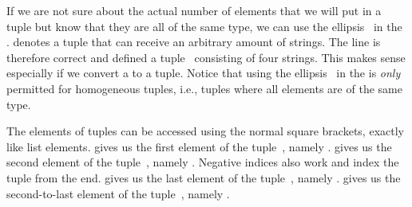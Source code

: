 %
\begin{sloppypar}%
If we are not sure about the actual number of elements that we will put in a tuple but know that they are all of the same type, we can use the ellipsis~\pythonIdx{\idxdots} in the .
 denotes a tuple that can receive an arbitrary amount of strings.
The line  is therefore correct and defined a tuple~ consisting of four strings.
This makes sense especially if we convert a  to a tuple. %
Notice that using the ellipsis~\pythonIdx{\idxdots} in the   is \emph{only} permitted for homogeneous tuples, i.e., tuples where all elements are of the same type.%
\end{sloppypar}%
%
The elements of tuples can be accessed using the normal square brackets, exactly like list elements.
 gives us the first element of the tuple~, namely .
 gives us the second element of the tuple~, namely .
Negative indices also work and index the tuple from the end.
 gives us the last element of the tuple~, namely .
 gives us the second-to-last element of the tuple~, namely .

